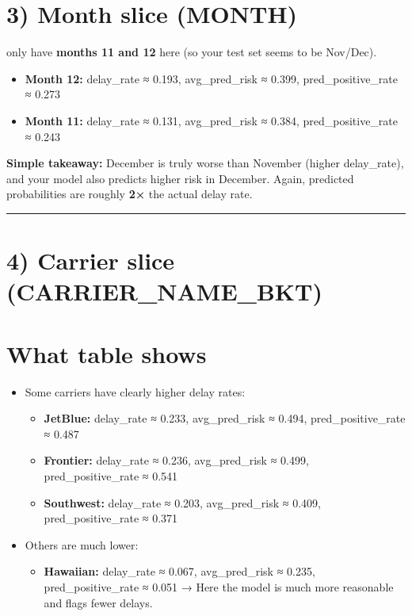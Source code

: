 \documentclass[11pt]{article}
\providecommand{\tightlist}{%
      \setlength{\itemsep}{0pt}\setlength{\parskip}{0pt}}
\begin{document}
\section{3) Month slice (MONTH)}\label{month-slice-month}

only have \textbf{months 11 and 12} here (so your test set seems to be
Nov/Dec).

\begin{itemize}
\tightlist
\item
  \textbf{Month 12:} delay\_rate ≈ 0.193, avg\_pred\_risk ≈ 0.399,
  pred\_positive\_rate ≈ 0.273
\item
  \textbf{Month 11:} delay\_rate ≈ 0.131, avg\_pred\_risk ≈ 0.384,
  pred\_positive\_rate ≈ 0.243
\end{itemize}

\textbf{Simple takeaway:} December is truly worse than November (higher
delay\_rate), and your model also predicts higher risk in December.
Again, predicted probabilities are roughly \textbf{2×} the actual delay
rate.

\begin{center}\rule{0.5\linewidth}{0.5pt}\end{center}

\section{4) Carrier slice
(CARRIER\_NAME\_BKT)}\label{carrier-slice-carrier_name_bkt}

\section{What table shows}\label{what-table-shows-2}

\begin{itemize}
\item
  Some carriers have clearly higher delay rates:

  \begin{itemize}
  \tightlist
  \item
    \textbf{JetBlue:} delay\_rate ≈ 0.233, avg\_pred\_risk ≈ 0.494,
    pred\_positive\_rate ≈ 0.487
  \item
    \textbf{Frontier:} delay\_rate ≈ 0.236, avg\_pred\_risk ≈ 0.499,
    pred\_positive\_rate ≈ 0.541
  \item
    \textbf{Southwest:} delay\_rate ≈ 0.203, avg\_pred\_risk ≈ 0.409,
    pred\_positive\_rate ≈ 0.371
  \end{itemize}
\item
  Others are much lower:

  \begin{itemize}
  \tightlist
  \item
    \textbf{Hawaiian:} delay\_rate ≈ 0.067, avg\_pred\_risk ≈ 0.235,
    pred\_positive\_rate ≈ 0.051 → Here the model is much more
    reasonable and flags fewer delays.
  \end{itemize}
\end{itemize}
\end{document}
